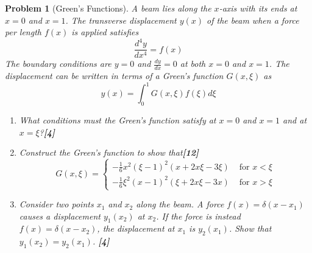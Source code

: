 \documentclass[a4paper]{article}
\theoremstyle{new}
\newtheorem{qns}{Problem}[section]
\begin{document}
\begin{qns}[Green's Functions]
A beam lies along the $x$-axis with its ends at $x = 0$ and $x = 1$. The transverse displacement $y(x)$ of the beam when a force per length $f(x)$ is applied satisfies
$$\frac{d^4y}{dx^4}=f(x)$$
The boundary conditions are $y = 0$ and $\frac{dy}{dx}=0$ at both $x = 0$ and $x = 1$. The displacement can be written in terms of a Green’s function $G(x,\xi)$ as
$$y(x)=\int_0^1G(x,\xi)f(\xi)d\xi$$
\begin{enumerate}[label=(\roman*)]
    \item What conditions must the Green’s function satisfy at $x = 0$ and $x = 1$ and at $x=\xi$?\hfill \textbf{[4]}
    \item Construct the Green’s function to show that\hfill \textbf{[12]}
$$G(x,\xi)=
\left\{
        \begin{array}{ll}
      -\frac{1}{6}x^2(\xi-1)^2(x+2x\xi-3\xi) & \text{ for }x<\xi \\
      -\frac{1}{6}\xi^2(x-1)^2(\xi+2x\xi-3x) & \text{ for } x>\xi
        \end{array}
    \right.$$
    \item Consider two points $x_1$ and $x_2$ along the beam. A force $f(x) =\delta (x − x_1)$ causes a
displacement $y_1(x_2)$ at $x_2$. If the force is instead $f(x) = \delta(x−x_2)$, the displacement at $x_1$ is $y_2(x_1)$. Show that $y_1(x_2) = y_2(x_1)$. \hfill \textbf{[4]}
\end{enumerate}
\end{qns}
\end{document}
